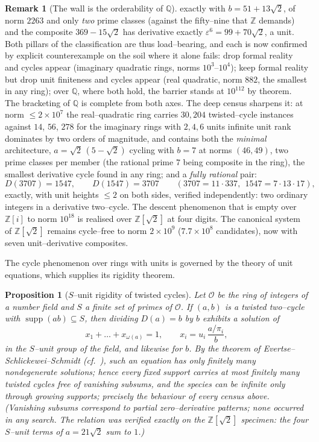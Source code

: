 \documentclass[11pt]{article}
\newtheorem{proposition}[theorem]{Proposition}
\theoremstyle{definition}
\newtheorem{remark}[theorem]{Remark}
\begin{document}
\begin{remark}[The wall is the orderability of $\mathbb{Q}$]
exactly with $b=51+13\sqrt2$, of norm $2263$ and only \emph{two} prime classes (against the
fifty--nine that $\mathbb{Z}$ demands) and the composite $369-15\sqrt2$ has derivative exactly
$\varepsilon^6=99+70\sqrt2$, a unit. Both pillars of the classification are thus load--bearing, and each
is now confirmed by explicit counterexample on the soil where it alone fails: drop formal reality and
cycles appear (imaginary quadratic rings, norms $10^3$--$10^4$); keep formal reality but drop unit
finiteness and cycles appear (real quadratic, norm $882$, the smallest in any ring); over $\mathbb{Q}$,
where both hold, the barrier stands at $10^{112}$ by theorem. The bracketing of $\mathbb{Q}$ is complete
from both axes. The deep census sharpens it: at norm $\le2\times10^7$ the real--quadratic ring carries
$30{,}204$ twisted--cycle instances against $14$, $56$, $278$ for the imaginary rings with $2,4,6$ units
infinite unit rank dominates by two orders of magnitude, and contains both the \emph{minimal}
architecture, $a=\sqrt2\,(5-\sqrt2)$ cycling with $b=7$ at norms $(46,49)$, two prime classes per member
(the rational prime $7$ being composite in the ring), the smallest derivative cycle found in any ring;
and a \emph{fully rational} pair:
\[ D(3707)=1547,\qquad D(1547)=3707\qquad(3707=11\cdot337,\ \ 1547=7\cdot13\cdot17), \]
exactly, with unit heights $\le2$ on both sides, verified independently: two ordinary integers in a
derivative two--cycle. The descent phenomenon that is empty over $\mathbb{Z}[i]$ to norm $10^{18}$ is
realised over $\mathbb{Z}[\sqrt2]$ at four digits. The canonical system of $\mathbb{Z}[\sqrt2]$ remains
cycle--free to norm $2\times10^9$ ($7.7\times10^8$ candidates), now with seven unit--derivative
composites.
\end{remark}

The cycle phenomenon over rings with units is governed by the theory of unit equations, which supplies
its rigidity theorem.

\begin{proposition}[$S$--unit rigidity of twisted cycles]\label{prop:sunit}
Let $\mathcal{O}$ be the ring of integers of a number field and $S$ a finite set of primes of
$\mathcal{O}$. If $(a,b)$ is a twisted two--cycle with $\operatorname{supp}(ab)\subseteq S$, then
dividing $D(a)=b$ by $b$ exhibits a solution of
\[ x_1+\dots+x_{\omega(a)}=1,\qquad x_i=u_i\,\frac{a/\pi_i}{b}, \]
in the $S$--unit group of the field, and likewise for $b$. By the theorem of
Evertse--Schlickewei--Schmidt \cite{ESS2002} (cf.\ \cite{Evertse1984}), such an equation has only
finitely many nondegenerate solutions; hence \emph{every fixed support carries at most finitely many
twisted cycles free of vanishing subsums}, and the species can be infinite only through growing
supports; precisely the behaviour of every census above. (Vanishing subsums correspond to partial
zero--derivative patterns; none occurred in any search. The relation was verified exactly on the
$\mathbb{Z}[\sqrt2]$ specimen: the four $S$--unit terms of $a=21\sqrt2$ sum to $1$.)
\end{proposition}
\end{document}
